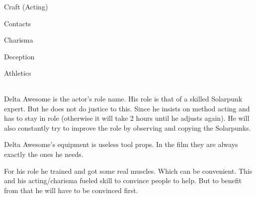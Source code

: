 \begin{npcBox}[title=Delta Awesome]

    \begin{aspects}
    \item {}
    \item {}    
    \item {}    
    \end{aspects}
    
    \begin{skills}
    \item {} Craft (Acting)
    \item {} Contacts
    \item {} Charisma
    \item {} Deception
    \item {} Athletics
    \end{skills}
    
    \begin{stunts}
    \item {}
    \end{stunts}
    
    \begin{stressSection}
    \end{stressSection}
    \begin{tabularx}{\textwidth}{ XX }
    \end{tabularx}
    
    \begin{consequences}
    \item {}
    \item {}
    \item {}
    \end{consequences}
    
    \begin{npcDescription}
    Delta Awesome is the actor's role name. His role is that of a skilled Solarpunk expert. But he
    does not do justice to this. Since he insists on method acting and has to stay in role (otherwise it will take 2 hours until he adjusts again). He will also constantly try to improve the role by observing and copying the Solarpunks.
    
    Delta Awesome's equipment is useless tool props. In the film they are always exactly the ones he needs. 

    For his role he trained and got some real muscles. Which can be convenient. This and his acting/charisma fueled skill to convince people to help. But to benefit from that he will have to be convinced first.
    \end{npcDescription}
    
\end{npcBox}


